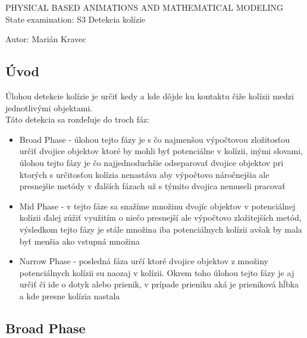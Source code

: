 \documentclass[a4paper]{article}
\begin{document}
 
	
	\pagestyle{plain}
	
	\begin{center}
		\sc\large
		PHYSICAL BASED ANIMATIONS AND MATHEMATICAL MODELING
		\\
		State examination: S3 Detekcia kolízie 
	\end{center}

	Autor: Marián Kravec
	\\
	
	\subsection{Úvod}
	
	Úlohou detekcie kolízie je určiť kedy a kde dôjde ku kontaktu čiže kolízii medzi jednotlivými objektami.
	\\
		
	Táto detekcia sa rozdeľuje do troch fáz:
	\begin{itemize}
		\item Broad Phase - úlohou tejto fázy je s čo najmenšou výpočtovou zložitosťou určiť dvojice objektov ktoré by mohli byť potenciálne v kolízii, inými slovami, úlohou tejto fázy je čo najjednoduchšie odseparovať dvojice objektov pri ktorých s určitosťou kolízia nenastáva aby výpočtovo náročnejšia ale presnejšie metódy v ďalších fázach už s týmito dvojica nemuseli pracovať
		\item Mid Phase - v tejto fáze sa snažíme množinu dvojíc objektov v potenciálnej kolízii ďalej zúžiť využitím o niečo presnejší ale výpočtovo zložitejších metód, výsledkom tejto fázy je stále množina iba potenciálnych kolízii avšak by mala byť menšia ako vstupná množina
		\item Narrow Phase - posledná fáza určí ktoré dvojice objektov z množiny potenciálnych kolízii su naozaj v kolízii. Okrem toho úlohou tejto fázy je aj určiť či ide o dotyk alebo prienik, v prípade prieniku aká je prieniková hĺbka a kde presne kolízia nastala
	\end{itemize} 

	\subsection{Broad Phase}
	
\end{document}
